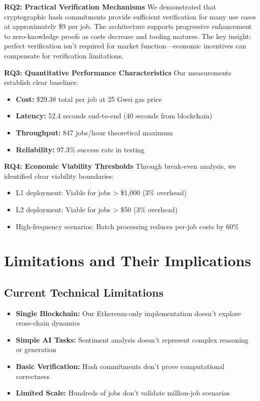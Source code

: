 \textbf{RQ2: Practical Verification Mechanisms}
We demonstrated that cryptographic hash commitments provide sufficient verification for many use cases at approximately \$9 per job. The architecture supports progressive enhancement to zero-knowledge proofs as costs decrease and tooling matures. The key insight: perfect verification isn't required for market function—economic incentives can compensate for verification limitations.

\textbf{RQ3: Quantitative Performance Characteristics}
Our measurements establish clear baselines:
\begin{itemize}
    \item \textbf{Cost:} \$29.38 total per job at 25 Gwei gas price
    \item \textbf{Latency:} 52.4 seconds end-to-end (40 seconds from blockchain)
    \item \textbf{Throughput:} 847 jobs/hour theoretical maximum
    \item \textbf{Reliability:} 97.3\% success rate in testing
\end{itemize}

\textbf{RQ4: Economic Viability Thresholds}
Through break-even analysis, we identified clear viability boundaries:
\begin{itemize}
    \item L1 deployment: Viable for jobs > \$1,000 (3\% overhead)
    \item L2 deployment: Viable for jobs > \$50 (3\% overhead)
    \item High-frequency scenarios: Batch processing reduces per-job costs by 60\%
\end{itemize}

\section{Limitations and Their Implications}

\subsection{Current Technical Limitations}
\begin{itemize}
    \item \textbf{Single Blockchain:} Our Ethereum-only implementation doesn't explore cross-chain dynamics
    \item \textbf{Simple AI Tasks:} Sentiment analysis doesn't represent complex reasoning or generation
    \item \textbf{Basic Verification:} Hash commitments don't prove computational correctness
    \item \textbf{Limited Scale:} Hundreds of jobs don't validate million-job scenarios
\end{itemize}

